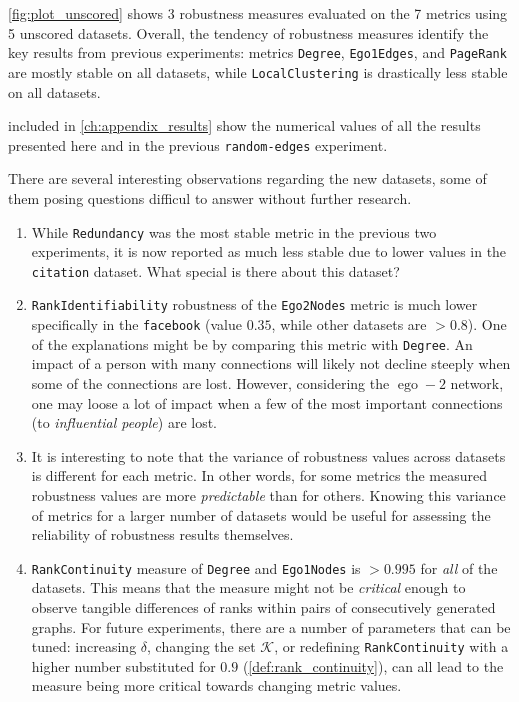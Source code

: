 

\autoref{fig:plot_unscored} shows 3 robustness measures evaluated on the 7 metrics using 5 unscored datasets.
Overall, the tendency of robustness measures identify the key results from previous experiments: metrics \texttt{Degree}, \texttt{Ego1Edges}, and \texttt{PageRank} are mostly stable on all datasets, while \texttt{LocalClustering} is drastically less stable on all datasets.

 included in \cref{ch:appendix_results} show the numerical values of all the results presented here and in the previous \texttt{random-edges} experiment.

There are several interesting observations regarding the new datasets, some of them posing questions difficul to answer without further research.

\begin{enumerate}
    \item While \texttt{Redundancy} was the most stable metric in the previous two experiments, it is now reported as much less stable due to lower values in the \texttt{citation} dataset.
    What special is there about this dataset?
    \item \texttt{RankIdentifiability} robustness of the \texttt{Ego2Nodes} metric is much lower specifically in the \texttt{facebook} (value $0.35$, while other datasets are $ >0.8 $).
    One of the explanations might be by comparing this metric with \texttt{Degree}.
    An impact of a person with many connections will likely not decline steeply when some of the connections are lost.
    However, considering the $\operatorname{ego}-2$ network, one may loose a lot of impact when a few of the most important connections (to \textsl{influential people}) are lost.
    \item It is interesting to note that the variance of robustness values across datasets is different for each metric.
    In other words, for some metrics the measured robustness values are more \textsl{predictable} than for others.
    Knowing this variance of metrics for a larger number of datasets would be useful for assessing the reliability of robustness results themselves.
    \item \texttt{RankContinuity} measure of \texttt{Degree} and \texttt{Ego1Nodes} is $ >0.995$ for \textsl{all} of the datasets.
    This means that the measure might not be \textsl{critical} enough to observe tangible differences of ranks within pairs of consecutively generated graphs.
    For future experiments, there are a number of parameters that can be tuned: increasing $\delta$, changing the set $\mathcal{K}$, or redefining \texttt{RankContinuity} with a higher number substituted for $0.9$ (\cref{def:rank_continuity}), can all lead to the measure being more critical towards changing metric values.
\end{enumerate}

